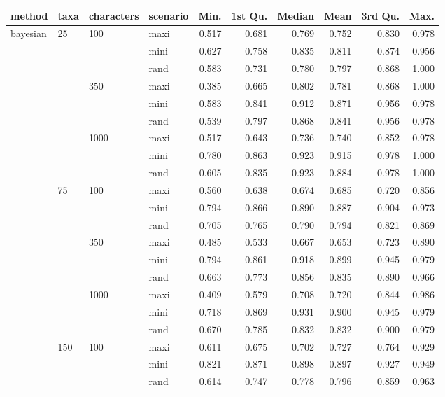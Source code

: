 \begin{longtable}{llllrrrrrr}
  \hline
method & taxa & characters & scenario & Min. & 1st Qu. & Median & Mean & 3rd Qu. & Max. \\ 
  \hline
bayesian & 25 & 100 & maxi & 0.517 & 0.681 & 0.769 & 0.752 & 0.830 & 0.978 \\ 
   &  &  & mini & 0.627 & 0.758 & 0.835 & 0.811 & 0.874 & 0.956 \\ 
   &  &  & rand & 0.583 & 0.731 & 0.780 & 0.797 & 0.868 & 1.000 \\ 
   &  & 350 & maxi & 0.385 & 0.665 & 0.802 & 0.781 & 0.868 & 1.000 \\ 
   &  &  & mini & 0.583 & 0.841 & 0.912 & 0.871 & 0.956 & 0.978 \\ 
   &  &  & rand & 0.539 & 0.797 & 0.868 & 0.841 & 0.956 & 0.978 \\ 
   &  & 1000 & maxi & 0.517 & 0.643 & 0.736 & 0.740 & 0.852 & 0.978 \\ 
   &  &  & mini & 0.780 & 0.863 & 0.923 & 0.915 & 0.978 & 1.000 \\ 
   &  &  & rand & 0.605 & 0.835 & 0.923 & 0.884 & 0.978 & 1.000 \\ 
   & 75 & 100 & maxi & 0.560 & 0.638 & 0.674 & 0.685 & 0.720 & 0.856 \\ 
   &  &  & mini & 0.794 & 0.866 & 0.890 & 0.887 & 0.904 & 0.973 \\ 
   &  &  & rand & 0.705 & 0.765 & 0.790 & 0.794 & 0.821 & 0.869 \\ 
   &  & 350 & maxi & 0.485 & 0.533 & 0.667 & 0.653 & 0.723 & 0.890 \\ 
   &  &  & mini & 0.794 & 0.861 & 0.918 & 0.899 & 0.945 & 0.979 \\ 
   &  &  & rand & 0.663 & 0.773 & 0.856 & 0.835 & 0.890 & 0.966 \\ 
   &  & 1000 & maxi & 0.409 & 0.579 & 0.708 & 0.720 & 0.844 & 0.986 \\ 
   &  &  & mini & 0.718 & 0.869 & 0.931 & 0.900 & 0.945 & 0.979 \\ 
   &  &  & rand & 0.670 & 0.785 & 0.832 & 0.832 & 0.900 & 0.979 \\ 
   & 150 & 100 & maxi & 0.611 & 0.675 & 0.702 & 0.727 & 0.764 & 0.929 \\ 
   &  &  & mini & 0.821 & 0.871 & 0.898 & 0.897 & 0.927 & 0.949 \\ 
   &  &  & rand & 0.614 & 0.747 & 0.778 & 0.796 & 0.859 & 0.963 \\ 

\end{longtable}
